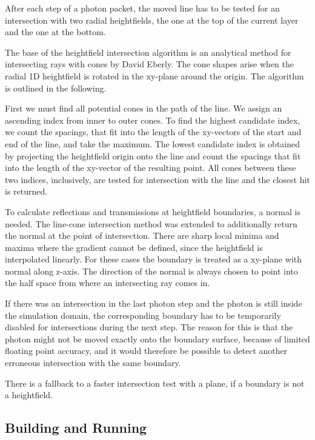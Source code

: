 \documentclass[]{article}
\begin{document}
After each step of a photon packet, the moved line has to be tested for an intersection with two radial heightfields, the one at the top of the current layer and the one at the bottom.

The base of the heightfield intersection algorithm is an analytical method for intersecting rays with cones by David Eberly\cite{schneider2002geometric}. The cone shapes arise when the radial 1D heightfield is rotated in the xy-plane around the origin. The algorithm is outlined in the following.

First we must find all potential cones in the path of the line. We assign an ascending index from inner to outer cones. To find the highest candidate index, we count the spacings, that fit into the length of the xy-vectors of the start and end of the line, and take the maximum. The lowest candidate index is obtained by projecting the heightfield origin onto the line and count the spacings that fit into the length of the xy-vector of the resulting point. All cones between these two indices, inclusively, are tested for intersection with the line and the closest hit is returned.

To calculate reflections and transmissions at heightfield boundaries, a normal is needed. The line-cone intersection method was extended to additionally return the normal at the point of intersection. There are sharp local minima and maxima where the gradient cannot be defined, since the heightfield is interpolated linearly. For these cases the boundary is treated as a xy-plane with normal along z-axis. The direction of the normal is always chosen to point into the half space from where an intersecting ray comes in.

If there was an intersection in the last photon step and the photon is still inside the simulation domain, the corresponding boundary has to be temporarily disabled for intersections during the next step. The reason for this is that the photon might not be moved exactly onto the boundary surface, because of limited floating point accuracy, and it would therefore be possible to detect another erroneous intersection with the same boundary.

There is a fallback to a faster intersection test with a plane, if a boundary is not a heightfield.

\subsection{Building and Running}
\end{document}

